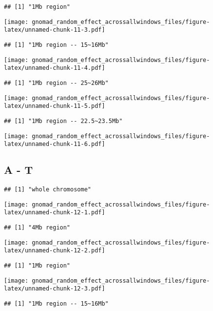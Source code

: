 \documentclass[
]{article}
\begin{document}
\begin{verbatim}
## [1] "1Mb region"
\end{verbatim}

\texttt{[image: gnomad\_random\_effect\_acrossallwindows\_files/figure-latex/unnamed-chunk-11-3.pdf]}

\begin{verbatim}
## [1] "1Mb region -- 15~16Mb"
\end{verbatim}

\texttt{[image: gnomad\_random\_effect\_acrossallwindows\_files/figure-latex/unnamed-chunk-11-4.pdf]}

\begin{verbatim}
## [1] "1Mb region -- 25~26Mb"
\end{verbatim}

\texttt{[image: gnomad\_random\_effect\_acrossallwindows\_files/figure-latex/unnamed-chunk-11-5.pdf]}

\begin{verbatim}
## [1] "1Mb region -- 22.5~23.5Mb"
\end{verbatim}

\texttt{[image: gnomad\_random\_effect\_acrossallwindows\_files/figure-latex/unnamed-chunk-11-6.pdf]}

\hypertarget{a---t-1}{%
\subsection{A - T}\label{a---t-1}}

\begin{verbatim}
## [1] "whole chromosome"
\end{verbatim}

\texttt{[image: gnomad\_random\_effect\_acrossallwindows\_files/figure-latex/unnamed-chunk-12-1.pdf]}

\begin{verbatim}
## [1] "4Mb region"
\end{verbatim}

\texttt{[image: gnomad\_random\_effect\_acrossallwindows\_files/figure-latex/unnamed-chunk-12-2.pdf]}

\begin{verbatim}
## [1] "1Mb region"
\end{verbatim}

\texttt{[image: gnomad\_random\_effect\_acrossallwindows\_files/figure-latex/unnamed-chunk-12-3.pdf]}

\begin{verbatim}
## [1] "1Mb region -- 15~16Mb"
\end{verbatim}
\end{document}
